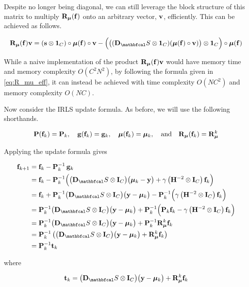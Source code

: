 Despite no longer being diagonal, we can still leverage the block structure of this matrix to multiply $\mathbf{R}_{\boldsymbol{\mu}}(\mathbf{f})$ onto an arbitrary vector, $\mathbf{v}$, efficiently. This can be achieved as follows. 


\begin{equation}
    \label{eq:R_mu_eff}
    \RR_{\muu}(\f) \ve = (\s \otimes \one_C) \circ  \muu(\f) \circ \ve - \Big(\big((\D_\St \otimes \one_C) (\muu(\f) \circ \ve) \big) \otimes \one_C \Big) \circ \muu(\f)
\end{equation}

While a naive implementation of the product $\mathbf{R}_{\boldsymbol{\mu}}(\mathbf{f}) \mathbf{v}$ would have memory time and memory complexity $O\left(C^2N^2\right)$, by following the formula given in \cref{eq:R_mu_eff}, it can instead be achieved with time complexity $O(NC^2)$ and memory complexity $O(NC)$. 

Now consider the IRLS update formula. As before, we will use the following shorthands. 

\begin{equation*}
    \mathbf{P}(\mathbf{f}_k) = \mathbf{P}_k, \quad \mathbf{g}(\mathbf{f}_k) = \mathbf{g}_k, \quad \boldsymbol{\mu}(\mathbf{f}_k) = \boldsymbol{\mu}_k, \quad \text{and} \quad \mathbf{R}_{\boldsymbol{\mu}}(\mathbf{f}_k) = \mathbf{R}_{\boldsymbol{\mu}}^k
\end{equation*}

Applying the update formula gives

\begin{align*}
    \f_{k+1} &= \f_k - \PP^{-1}_k \, \g_k\\
    &= \f_{k} - \PP^{-1}_k \Big(\big(\D_\St \otimes \I_C\big) \big(\muu_k - \y\big) + \gamma \left(\HH^{-2} \otimes \I_C\right) \f_k\Big) \\
    &= \f_k + \PP^{-1}_k \big(\D_\St \otimes \I_C\big) \big(\y - \muu_k\big) - \PP^{-1}_k \Big(\gamma \left(\HH^{-2} \otimes \I_C\right) \f_k\Big) \\
    &= \PP^{-1}_k \big(\D_\St \otimes \I_C\big) \big(\y - \muu_k \big) + \PP^{-1}_k \Big(\PP_k \f_k - \gamma \left(\HH^{-2} \otimes \I_C\right) \f_k\Big) \\
    &= \PP^{-1}_k \big(\D_\St \otimes \I_C\big) \big(\y - \muu_k \big) + \PP^{-1}_k \RR_{\muu}^k\f_k  \\
    &= \PP^{-1}_k \left(\big(\D_\St \otimes \I_C\big)\big(\y - \muu_k \big) + \RR_{\muu}^k\f_k \right) \\
    &= \PP^{-1}_k \tee_k
\end{align*}

where 

\begin{equation*}
    \tee_k = \big(\D_\St \otimes \I_C\big)\big(\y - \muu_k \big) + \RR_{\muu}^k\f_k
\end{equation*}

